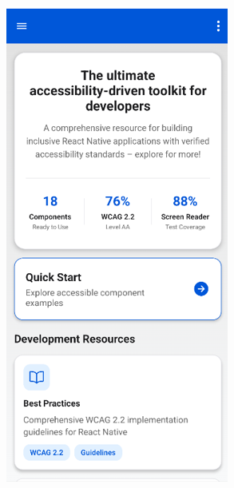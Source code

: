 \begin{figure}[ht]
\begin{subfigure}[b]{0.48\textwidth}
        \includegraphics[width=\linewidth, alt={First part of the Home Screen}]{img/home1.png}

\end{subfigure}
\end{figure}
